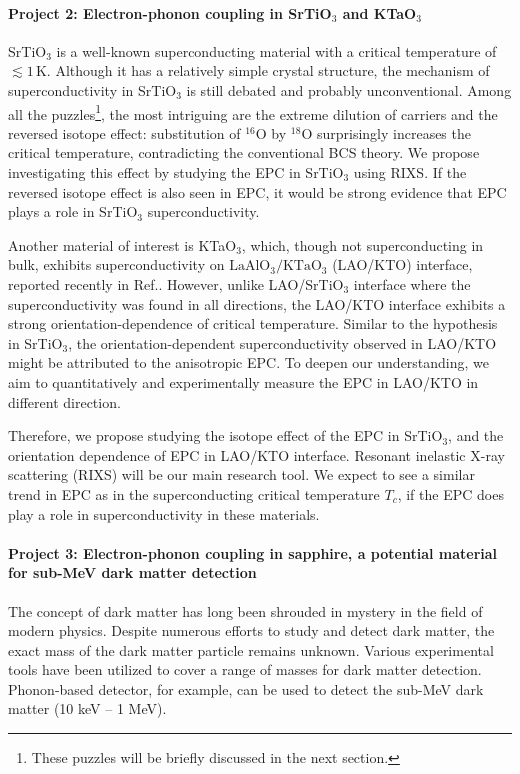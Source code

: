 \documentclass[11pt]{article}
\begin{document}
\paragraph{Project 2: Electron-phonon coupling in SrTiO$_{3}$ and KTaO$_{3}$} 
SrTiO$_{3}$ is a well-known superconducting material with a critical temperature of $\lesssim 1\, \mathrm{K}$\cite{schooley_superconductivity_1964,lin_fermi_2013}. 
Although it has a  relatively simple crystal structure, the mechanism of superconductivity in SrTiO$_{3}$ is still debated and probably unconventional. 
Among all the puzzles\footnote{These puzzles will be briefly discussed in the next section.}, the most intriguing are the extreme dilution of carriers and the reversed isotope effect: substitution of ${}^{16}\mathrm{O}$ by ${}^{18}\mathrm{O}$ surprisingly increases the critical temperature, contradicting the conventional BCS theory\cite{stucky_isotope_2016}. 
We propose investigating this effect by studying the EPC in SrTiO$_{3}$ using RIXS. If the reversed isotope effect is also seen in EPC, it would be strong evidence that EPC plays a role in SrTiO$_{3}$ superconductivity.

Another material of interest is KTaO$_{3}$, which, though not superconducting in bulk, exhibits superconductivity on $\mathrm{LaAlO_{3}/KTaO_{3}}$ (LAO/KTO) interface, reported recently in Ref.\cite{ren_two-dimensional_2022}. 
However, unlike LAO/SrTiO$_{3}$ interface where the superconductivity was found in all directions, the LAO/KTO interface exhibits a strong orientation-dependence of critical temperature\cite{ren_two-dimensional_2022,chen_two-dimensional_2021}. Similar to the hypothesis in SrTiO$_{3}$, the orientation-dependent superconductivity observed in LAO/KTO might be attributed to the anisotropic EPC. 
To deepen our understanding, we aim to quantitatively and experimentally measure the EPC in LAO/KTO in different direction. 

Therefore, we propose studying the isotope effect of the EPC in SrTiO$_{3}$, and the orientation dependence of EPC in LAO/KTO interface. 
Resonant inelastic X-ray scattering (RIXS) will be our main research tool. 
We expect to see a similar trend in EPC as in the superconducting critical temperature $T_{c}$, if the EPC does play a role in superconductivity in these materials.

\paragraph{Project 3: Electron-phonon coupling in sapphire, a potential material for sub-MeV dark matter detection}
The concept of dark matter has long been shrouded in mystery in the field of modern physics. 
Despite numerous efforts to study and detect dark matter\cite{bergstrom_non-baryonic_2000,vogel_dark_2014,essig_first_2012,davidson_updated_2000}, the exact mass of the dark matter particle remains unknown. 
Various experimental tools have been utilized to cover a range of masses for dark matter detection. 
Phonon-based detector, for example, can be used to detect the sub-MeV dark matter (10 keV -- 1 MeV)\cite{griffin_directional_2018}.
  
\end{document}
